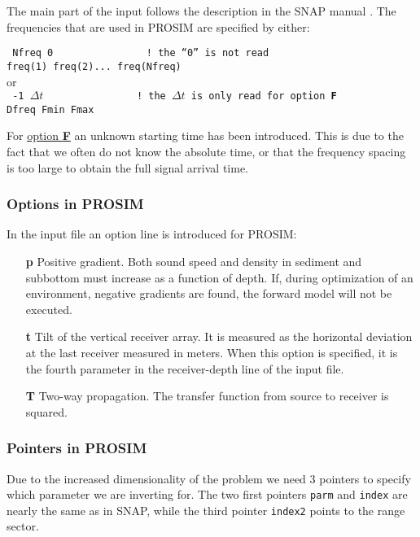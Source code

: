 \documentclass{saclantc}
\begin{document}
The main part of the input follows the description in the {\sf SNAP} manual
\cite{snap}. The frequencies that are used in {\sf PROSIM} 
are specified by either:

{\tt
Nfreq  0~~~~~~~~~~~~~~~     ! the  ``0'' is not read\\
freq(1) freq(2)... freq(Nfreq)\\
}
or \\
{\tt
-1   $\Delta t$~~~~~~~~~~~~~~~     ! the  $\Delta t$ is only read for
option {\bf F} \\
Dfreq Fmin Fmax\\
}

For \underline{option {\bf F}} an unknown starting time has been introduced. This
is due to the fact that we often do not know the absolute time, or that
the frequency spacing is too large to obtain the full signal arrival time.


\clearpage
\subsubsection{Options in PROSIM}
In the input file an option line is introduced for {\sf PROSIM}:
\begin{itemize}
 \item[\bf p]     Positive gradient. Both sound speed and density in
sediment and subbottom must increase as a function of depth.
If, during optimization of an environment, negative gradients are found, the
forward model will not be executed.
 \item[\bf t] Tilt of the vertical receiver array. 
It is measured
as the horizontal deviation at the last receiver measured in
meters. When this option is specified, it is the fourth parameter in
the receiver-depth line of the input file.
   \item[\bf T] Two-way propagation. The transfer function from source to receiver is squared.

\end{itemize}


\subsubsection{Pointers in PROSIM}
\label{se:prosimpoint}
Due to the increased dimensionality of the problem we need 3 pointers to specify
which parameter we are inverting for. The two first pointers {\tt parm} and
{\tt index} are nearly the same as in
{\sf SNAP}, while the third pointer {\tt index2} points to the range sector.
\end{document}
